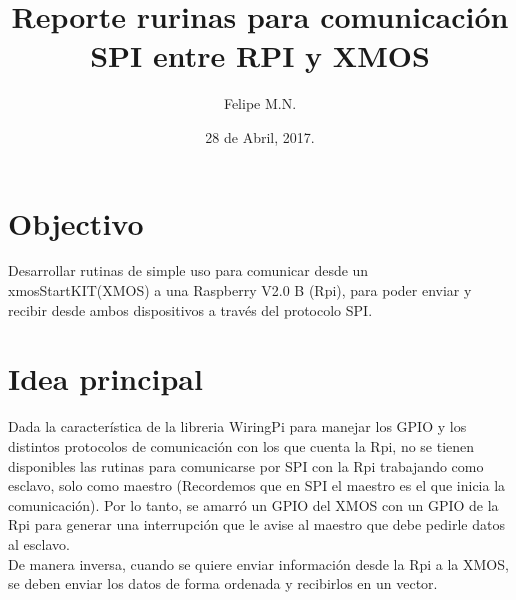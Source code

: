 \documentclass{article}
\title{Reporte rurinas para comunicación SPI entre RPI y XMOS}
\author{Felipe M.N.} %
\date{28 de Abril, 2017.} %
\begin{document}
\maketitle %




\section{Objectivo}
Desarrollar rutinas de simple uso para comunicar desde un xmosStartKIT(XMOS) a una Raspberry V2.0 B (Rpi),  para poder enviar y recibir desde ambos dispositivos a través del protocolo SPI.
\section{Idea principal}
Dada la característica de la libreria WiringPi para manejar los GPIO y los distintos protocolos de comunicación con los que cuenta la Rpi, no se tienen disponibles las rutinas para comunicarse por SPI con la Rpi trabajando como esclavo, solo como maestro (Recordemos que en SPI el maestro es el que inicia la comunicación). Por lo tanto, se amarró un GPIO del XMOS con un GPIO de la Rpi para generar una interrupción que le avise al maestro que debe pedirle datos al esclavo.\\[0.2cm]
De manera inversa, cuando se quiere enviar información desde la Rpi a la XMOS, se deben enviar los datos de forma ordenada y recibirlos en un vector.\newpage
\end{document}

